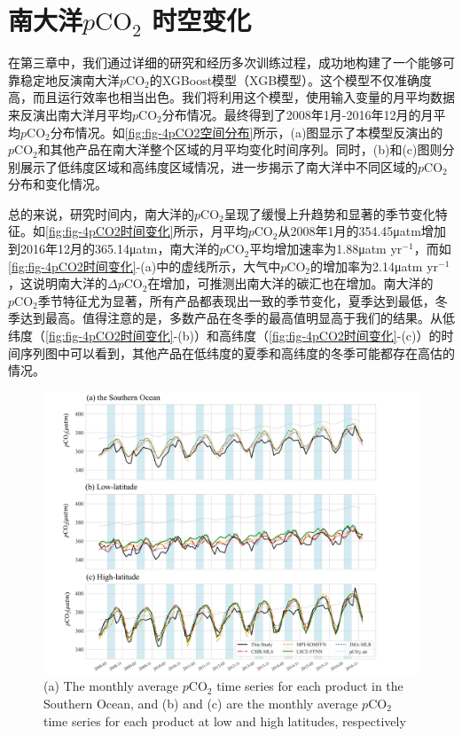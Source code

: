 \section{南大洋\texorpdfstring{$p\mathrm{CO_2}$ }{}时空变化}
在第三章中，我们通过详细的研究和经历多次训练过程，成功地构建了一个能够可靠稳定地反演南大洋$p\mathrm{CO_2}$的XGBoost模型（XGB模型）。这个模型不仅准确度高，而且运行效率也相当出色。我们将利用这个模型，使用输入变量的月平均数据来反演出南大洋月平均$p\mathrm{CO_2}$分布情况。最终得到了2008年1月-2016年12月的月平均$p\mathrm{CO_2}$分布情况。如\autoref{fig:fig-4pCO2空间分布}所示，(a)图显示了本模型反演出的$p\mathrm{CO_2}$和其他产品在南大洋整个区域的月平均变化时间序列。同时，(b)和(c)图则分别展示了低纬度区域和高纬度区域情况，进一步揭示了南大洋中不同区域的$p\mathrm{CO_2}$分布和变化情况。

总的来说，研究时间内，南大洋的$p\mathrm{CO_2}$呈现了缓慢上升趋势和显著的季节变化特征。如\autoref{fig:fig-4pCO2时间变化}所示，月平均$p\mathrm{CO_2}$从2008年1月的354.45μatm增加到2016年12月的365.14μatm，南大洋的$p\mathrm{CO_2}$平均增加速率为1.88μatm yr$^{-1}$，而如\autoref{fig:fig-4pCO2时间变化}-(a)中的虚线所示，大气中$p\mathrm{CO_2}$的增加率为2.14μatm yr$^{-1}$，这说明南大洋的$\Delta p\mathrm{CO_2}$在增加，可推测出南大洋的碳汇也在增加。南大洋的$p\mathrm{CO_2}$季节特征尤为显著，所有产品都表现出一致的季节变化，夏季达到最低，冬季达到最高。值得注意的是，多数产品在冬季的最高值明显高于我们的结果。从低纬度（\autoref{fig:fig-4pCO2时间变化}-(b)）和高纬度（\autoref{fig:fig-4pCO2时间变化}-(c)）的时间序列图中可以看到，其他产品在低纬度的夏季和高纬度的冬季可能都存在高估的情况。

\begin{figure}[htbp]
    \centering
    \includegraphics[width=1.1\linewidth]{figure/第四章用图/图4-pCO2.jpg}
    {(a) The monthly average $p\mathrm{CO_2}$ time series for each product in the Southern Ocean, and (b) and (c) are the monthly average $p\mathrm{CO_2}$ time series for each product at low and high latitudes, respectively}
\end{figure}

